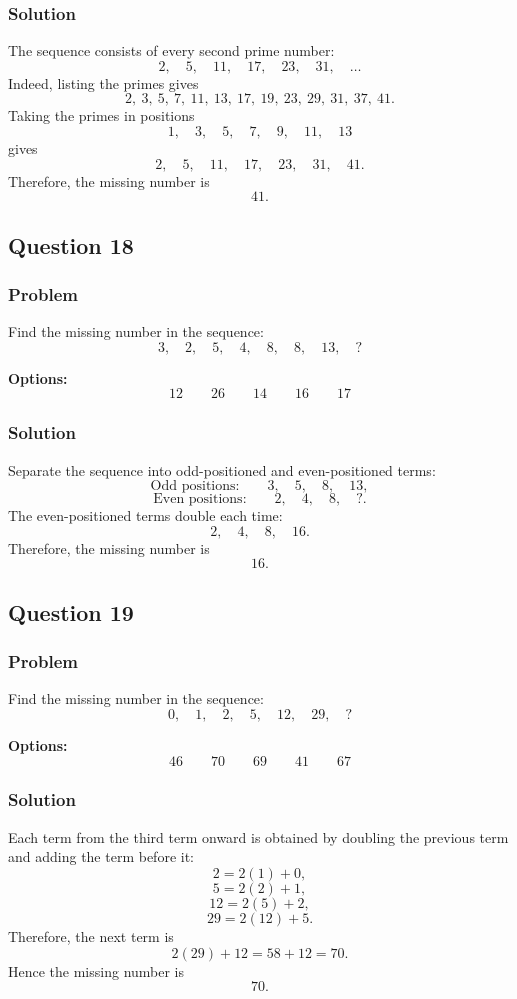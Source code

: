 \documentclass[12pt]{article}
\begin{document}
\subsubsection{Solution}
The sequence consists of every second prime number:
\[
2,\quad 5,\quad 11,\quad 17,\quad 23,\quad 31,\quad \ldots
\]
Indeed, listing the primes gives
\[
2,\ 3,\ 5,\ 7,\ 11,\ 13,\ 17,\ 19,\ 23,\ 29,\ 31,\ 37,\ 41.
\]
Taking the primes in positions
\[
1,\quad 3,\quad 5,\quad 7,\quad 9,\quad 11,\quad 13
\]
gives
\[
2,\quad 5,\quad 11,\quad 17,\quad 23,\quad 31,\quad 41.
\]
Therefore, the missing number is
\[
\boxed{41}.
\]

\subsection{Question 18}
\subsubsection{Problem}
Find the missing number in the sequence:
\[
3,\quad 2,\quad 5,\quad 4,\quad 8,\quad 8,\quad 13,\quad ?
\]

\noindent\textbf{Options:}
\[
\boxed{12}
\qquad
\boxed{26}
\qquad
\boxed{14}
\qquad
\boxed{16}
\qquad
\boxed{17}
\]

\subsubsection{Solution}
Separate the sequence into odd-positioned and even-positioned terms:
\[
\text{Odd positions:}\qquad 3,\quad 5,\quad 8,\quad 13,
\]
\[
\text{Even positions:}\qquad 2,\quad 4,\quad 8,\quad ?.
\]
The even-positioned terms double each time:
\[
2,\quad 4,\quad 8,\quad 16.
\]
Therefore, the missing number is
\[
\boxed{16}.
\]

\subsection{Question 19}
\subsubsection{Problem}
Find the missing number in the sequence:
\[
0,\quad 1,\quad 2,\quad 5,\quad 12,\quad 29,\quad ?
\]

\noindent\textbf{Options:}
\[
\boxed{46}
\qquad
\boxed{70}
\qquad
\boxed{69}
\qquad
\boxed{41}
\qquad
\boxed{67}
\]

\subsubsection{Solution}
Each term from the third term onward is obtained by doubling the previous term and adding the term before it:
\[
2=2(1)+0,
\]
\[
5=2(2)+1,
\]
\[
12=2(5)+2,
\]
\[
29=2(12)+5.
\]
Therefore, the next term is
\[
2(29)+12=58+12=70.
\]
Hence the missing number is
\[
\boxed{70}.
\]
\end{document}
